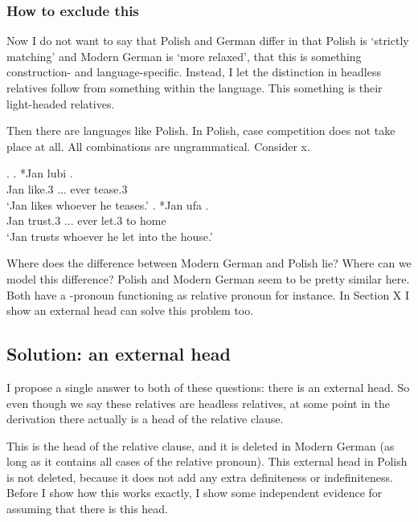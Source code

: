 \subsubsection{How to exclude this}

Now I do not want to say that Polish and German differ in that Polish is `strictly matching' and Modern German is `more relaxed', that this is something construction- and language-specific. Instead, I let the distinction in headless relatives follow from something within the language. This something is their light-headed relatives.

Then there are languages like Polish. In Polish, case competition does not take place at all. All combinations are ungrammatical. Consider x.

\ex.
\ag. *Jan lubi   .\\
Jan like.3\scsub{[acc]} ... ever tease.3\scsub{[dat]}\\
`Jan likes whoever he teases.'
\bg. *Jan ufa     .\\
 Jan trust.3\scsub{[dat]} ... ever let.3\scsub{[acc]} to home\\
 `Jan trusts whoever he let into the house.'

Where does the difference between Modern German and Polish lie? Where can we model this difference? Polish and Modern German seem to be pretty similar here. Both have a -pronoun functioning as relative pronoun for instance. In Section X I show an external head can solve this problem too.



\subsection{Solution: an external head}

I propose a single answer to both of these questions: there is an external head. So even though we say these relatives are headless relatives, at some point in the derivation there actually is a head of the relative clause.


This is the head of the relative clause, and it is deleted in Modern German (as long as it contains all cases of the relative pronoun). This external head in Polish is not deleted, because it does not add any extra definiteness or indefiniteness. Before I show how this works exactly, I show some independent evidence for assuming that there is this head.


